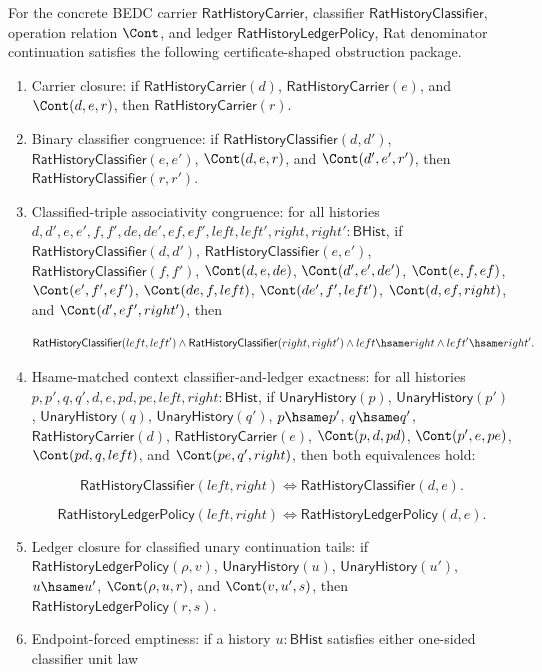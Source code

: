 \begin{theorem}
\label{thm:field-rat-denominator-associative-obstruction-package}
For the concrete BEDC carrier $\mathsf{RatHistoryCarrier}$, classifier
$\mathsf{RatHistoryClassifier}$, operation relation $\Cont$, and ledger
$\mathsf{RatHistoryLedgerPolicy}$, Rat denominator continuation satisfies the
following certificate-shaped obstruction package.
\begin{enumerate}
\item Carrier closure: if $\mathsf{RatHistoryCarrier}(d)$,
$\mathsf{RatHistoryCarrier}(e)$, and $\Cont(d,e,r)$, then
$\mathsf{RatHistoryCarrier}(r)$.
\item Binary classifier congruence: if
$\mathsf{RatHistoryClassifier}(d,d')$,
$\mathsf{RatHistoryClassifier}(e,e')$, $\Cont(d,e,r)$, and
$\Cont(d',e',r')$, then $\mathsf{RatHistoryClassifier}(r,r')$.
\item Classified-triple associativity congruence: for all histories
$d,d',e,e',f,f',de,de',ef,ef',left,left',right,right':\mathsf{BHist}$, if
$\mathsf{RatHistoryClassifier}(d,d')$,
$\mathsf{RatHistoryClassifier}(e,e')$,
$\mathsf{RatHistoryClassifier}(f,f')$, $\Cont(d,e,de)$,
$\Cont(d',e',de')$, $\Cont(e,f,ef)$, $\Cont(e',f',ef')$,
$\Cont(de,f,left)$, $\Cont(de',f',left')$, $\Cont(d,ef,right)$, and
$\Cont(d',ef',right')$, then

$$
\mathsf{RatHistoryClassifier}(left,left')\land
\mathsf{RatHistoryClassifier}(right,right')\land
left\hsame right\land left'\hsame right'.
$$

\item Hsame-matched context classifier-and-ledger exactness: for all histories
$p,p',q,q',d,e,pd,pe,left,right:\mathsf{BHist}$, if
$\mathsf{UnaryHistory}(p)$, $\mathsf{UnaryHistory}(p')$,
$\mathsf{UnaryHistory}(q)$, $\mathsf{UnaryHistory}(q')$, $p\hsame p'$,
$q\hsame q'$, $\mathsf{RatHistoryCarrier}(d)$,
$\mathsf{RatHistoryCarrier}(e)$, $\Cont(p,d,pd)$, $\Cont(p',e,pe)$,
$\Cont(pd,q,left)$, and $\Cont(pe,q',right)$, then both equivalences hold:

$$
\mathsf{RatHistoryClassifier}(left,right)\Longleftrightarrow
\mathsf{RatHistoryClassifier}(d,e).
$$

$$
\mathsf{RatHistoryLedgerPolicy}(left,right)\Longleftrightarrow
\mathsf{RatHistoryLedgerPolicy}(d,e).
$$

\item Ledger closure for classified unary continuation tails: if
$\mathsf{RatHistoryLedgerPolicy}(\rho,v)$, $\mathsf{UnaryHistory}(u)$,
$\mathsf{UnaryHistory}(u')$, $u\hsame u'$, $\Cont(\rho,u,r)$, and
$\Cont(v,u',s)$, then $\mathsf{RatHistoryLedgerPolicy}(r,s)$.
\item Endpoint-forced emptiness: if a history $u:\mathsf{BHist}$ satisfies
either one-sided classifier unit law


\end{enumerate}
\end{theorem}
